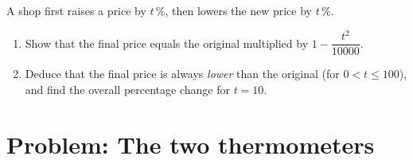 \begin{exercise}[$\star\star\star$]\label{exo:g9:linfunc:10}
A shop first raises a price by $t\,\%$, then lowers the new price by
$t\,\%$.
\begin{enumerate}
  \item Show that the final price equals the original multiplied by
        $1 - \dfrac{t^2}{10000}$.
  \item Deduce that the final price is always \emph{lower} than the
        original (for $0 < t \leq 100$), and find the overall percentage
        change for $t = 10$.
\end{enumerate}
\end{exercise}

\section{Problem: The two thermometers}

